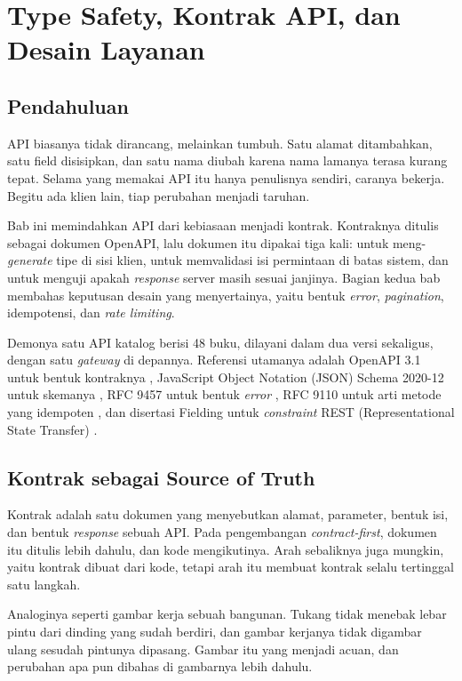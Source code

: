 \chapter{Type Safety, Kontrak API, dan Desain Layanan}
\label{ch:kontrak}

\section{Pendahuluan}

API biasanya tidak dirancang, melainkan tumbuh. Satu alamat ditambahkan,
satu field disisipkan, dan satu nama diubah karena nama lamanya terasa
kurang tepat. Selama yang memakai API itu hanya penulisnya sendiri, caranya
bekerja. Begitu ada klien lain, tiap perubahan menjadi taruhan.

Bab ini memindahkan API dari kebiasaan menjadi kontrak. Kontraknya ditulis
sebagai dokumen OpenAPI, lalu dokumen itu dipakai tiga kali: untuk
meng-\textit{generate} tipe di sisi klien, untuk memvalidasi isi permintaan
di batas sistem, dan untuk menguji apakah \textit{response} server masih sesuai
janjinya. Bagian kedua bab membahas keputusan desain yang menyertainya, yaitu
bentuk \textit{error}, \textit{pagination}, idempotensi, dan \textit{rate limiting}.

Demonya satu API katalog berisi 48 buku, dilayani dalam dua versi sekaligus,
dengan satu \textit{gateway} di depannya. Referensi utamanya adalah OpenAPI
3.1 untuk bentuk kontraknya \cite{openapi-31}, JavaScript Object Notation (JSON) Schema 2020-12 untuk
skemanya \cite{jsonschema-2020}, RFC 9457 untuk bentuk \textit{error}
\cite{rfc9457}, RFC 9110 untuk arti metode yang idempoten \cite{rfc9110},
dan disertasi Fielding untuk \textit{constraint} REST (Representational
State Transfer) \cite{fielding2000rest}.

\section{Kontrak sebagai Source of Truth}

Kontrak adalah satu dokumen yang menyebutkan alamat, parameter, bentuk isi,
dan bentuk \textit{response} sebuah API. Pada pengembangan \textit{contract-first},
dokumen itu ditulis lebih dahulu, dan kode mengikutinya. Arah sebaliknya juga
mungkin, yaitu kontrak dibuat dari kode, tetapi arah itu membuat kontrak
selalu tertinggal satu langkah.

Analoginya seperti gambar kerja sebuah bangunan. Tukang tidak menebak lebar
pintu dari dinding yang sudah berdiri, dan gambar kerjanya tidak digambar
ulang sesudah pintunya dipasang. Gambar itu yang menjadi acuan, dan perubahan
apa pun dibahas di gambarnya lebih dahulu.

